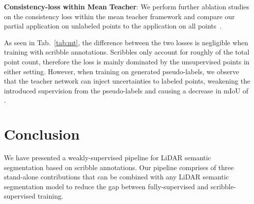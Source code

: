 \documentclass[10pt,twocolumn,letterpaper]{article}
\begin{document}
\begin{table}[t]
    \centering
    \tabcolsep=0.11cm
    \caption{Compared is the application of the consistency-loss on all points~\cite{cvpr2020towards10x} to our proposed partial application on only unlabeled points. We conduct experiments using the mean teacher pipeline with scribble annotations () and CRB pseudo-labels ().} 
    \label{tab:mt}
    \vspace{-10px}
\end{table}

\noindent \textbf{Consistency-loss within Mean Teacher}: We perform further ablation studies on the consistency loss within the mean teacher framework and compare our partial application on unlabeled points to the application on all points~\cite{cvpr2020towards10x}.

As seen in Tab.~\ref{tab:mt}, the difference between the two losses is negligible when training with scribble annotations. Scribbles only account for roughly  of the total point count, therefore the loss is mainly dominated by the unsupervised points in either setting. However, when training on generated pseudo-labels, we observe that the teacher network can inject uncertainties to labeled points, weakening the introduced supervision from the pseudo-labels and causing a decrease in mIoU of .

\section{Conclusion}

We have presented a weakly-supervised pipeline for LiDAR semantic segmentation based on scribble annotations. Our pipeline comprises of three stand-alone contributions that can be combined with any LiDAR semantic segmentation model to reduce the gap between fully-supervised and scribble-supervised training.
\end{document}

